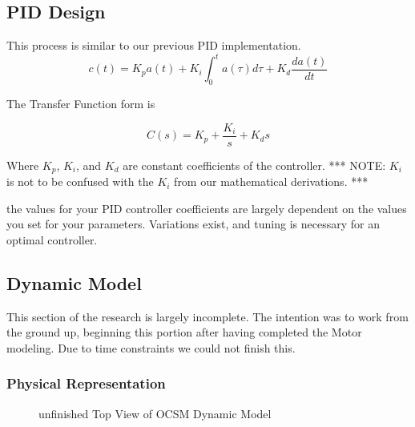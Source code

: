     
 \subsection{PID Design}
 This process is similar to our previous PID implementation. 
 \begin{equation}
c(t) = K_{p}a(t) + K_{i}\int ^{t}_{0} a(\tau) d\tau + K_{d} \frac{da(t)}{dt}
\end{equation}

The Transfer Function form is 

\begin{equation}
C(s) = K_{p} + \frac{K_{i}}{s}+K_{d} s
\end{equation}

\noindent Where $K_{p}$, $K_{i}$, and $K_{d}$ are constant coefficients of the controller. *** NOTE: $K_{i}$ is not to be confused with the $K_{i}$ from our mathematical derivations. ***

\noindent the values for your PID controller coefficients are largely dependent on the values you set for your parameters. Variations exist, and tuning is necessary for an optimal controller. 

\subsection{Dynamic Model}
This section of the research is largely incomplete. The intention was to work from the ground up, beginning this portion after having completed the Motor modeling. Due to time constraints we could not finish this.
\subsubsection{Physical Representation}

\begin{figure}[H]
\centering
{}
\caption{\label{fig:dynamic_birdseye} unfinished Top View of OCSM Dynamic Model}
\end{figure}

